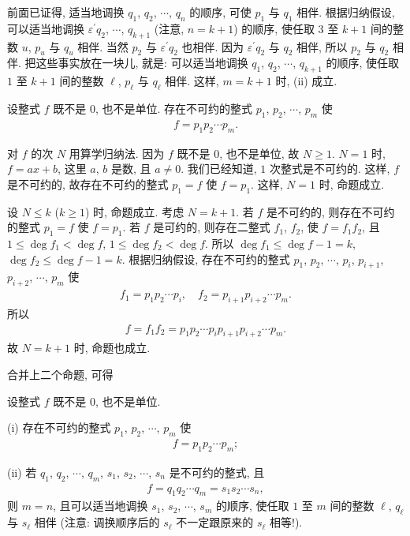 \begin{pf}
    前面已证得, 适当地调换 $q_1$, $q_2$, $\cdots$, $q_n$ 的顺序, 可使 $p_1$ 与 $q_1$ 相伴. 根据归纳假设, 可以适当地调换 $\varepsilon^{\prime} q_2$, $\cdots$, $q_{k+1}$ (注意, $n = k+1$) 的顺序, 使任取 $3$ 至 $k+1$ 间的整数 $u$, $p_u$ 与 $q_u$ 相伴. 当然 $p_2$ 与 $\varepsilon^{\prime} q_2$ 也相伴. 因为 $\varepsilon^{\prime} q_2$ 与 $q_2$ 相伴, 所以 $p_2$ 与 $q_2$ 相伴. 把这些事实放在一块儿, 就是: 可以适当地调换 $q_1$, $q_2$, $\cdots$, $q_{k+1}$ 的顺序, 使任取 $1$ 至 $k+1$ 间的整数 $\ell$, $p_{\ell}$ 与 $q_{\ell}$ 相伴. 这样, $m = k+1$ 时, (ii) 成立.
\end{pf}

\begin{proposition}
    设整式 $f$ 既不是 $0$, 也不是单位. 存在不可约的整式 $p_1$, $p_2$, $\cdots$, $p_m$ 使
    \begin{align*}
        f = p_1 p_2 \cdots p_m.
    \end{align*}
\end{proposition}

\begin{pf}
    对 $f$ 的次 $N$ 用算学归纳法. 因为 $f$ 既不是 $0$, 也不是单位, 故 $N \geq 1$. $N = 1$ 时, $f = ax + b$, 这里 $a$, $b$ 是数, 且 $a \neq 0$. 我们已经知道, $1$ 次整式是不可约的. 这样, $f$ 是不可约的, 故存在不可约的整式 $p_1 = f$ 使 $f = p_1$. 这样, $N = 1$ 时, 命题成立.

    设 $N \leq k$ ($k \geq 1$) 时, 命题成立. 考虑 $N = k+1$. 若 $f$ 是不可约的, 则存在不可约的整式 $p_1 = f$ 使 $f = p_1$. 若 $f$ 是可约的, 则存在二整式 $f_1$, $f_2$, 使 $f = f_1 f_2$, 且 $1 \leq \deg f_1 < \deg f$, $1 \leq \deg f_2 < \deg f$. 所以 $\deg f_1 \leq \deg f - 1 = k$, $\deg f_2 \leq \deg f - 1 = k$. 根据归纳假设, 存在不可约的整式 $p_1$, $p_2$, $\cdots$, $p_i$, $p_{i+1}$, $p_{i+2}$, $\cdots$, $p_m$ 使
    \begin{align*}
        f_1 = p_1 p_2 \cdots p_i, \quad f_2 = p_{i+1} p_{i+2} \cdots p_m.
    \end{align*}
    所以
    \begin{align*}
        f = f_1 f_2 = p_1 p_2 \cdots p_i p_{i+1} p_{i+2} \cdots p_m.
    \end{align*}
    故 $N = k+1$ 时, 命题也成立.
\end{pf}

合并上二个命题, 可得
\begin{proposition}
    设整式 $f$ 既不是 $0$, 也不是单位.

    (i) 存在不可约的整式 $p_1$, $p_2$, $\cdots$, $p_m$ 使
    \begin{align*}
        f = p_1 p_2 \cdots p_m;
    \end{align*}

    (ii) 若 $q_1$, $q_2$, $\cdots$, $q_m$, $s_1$, $s_2$, $\cdots$, $s_n$ 是不可约的整式, 且
    \begin{align*}
        f = q_1 q_2 \cdots q_m = s_1 s_2 \cdots s_n,
    \end{align*}
    则 $m = n$, 且可以适当地调换 $s_1$, $s_2$, $\cdots$, $s_m$ 的顺序, 使任取 $1$ 至 $m$ 间的整数 $\ell$, $q_\ell$ 与 $s_\ell$ 相伴 (注意: 调换顺序后的 $s_\ell$ 不一定跟原来的 $s_\ell$ 相等!).
\end{proposition}

